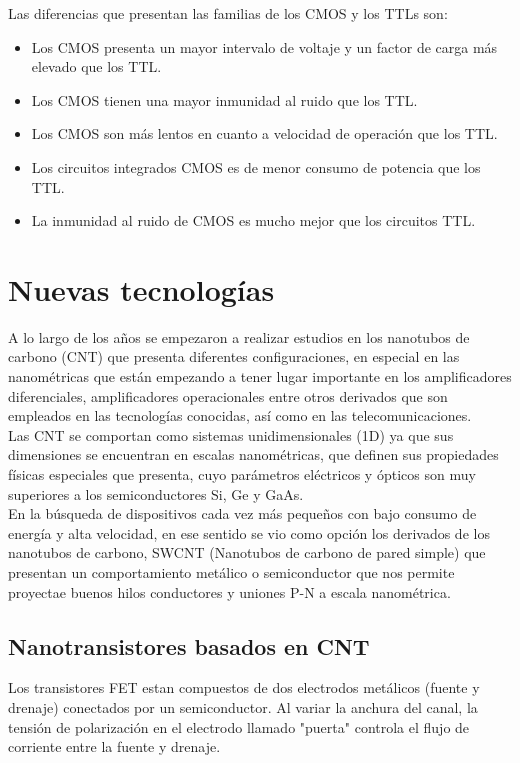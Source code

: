 \documentclass[a4paper]{article} %
\begin{document}
	Las diferencias que presentan las familias de los CMOS y los TTLs son:
	\begin{itemize}
		\item Los CMOS presenta un mayor intervalo de voltaje y un factor de carga más elevado que los TTL.
		\item Los CMOS tienen una mayor inmunidad al ruido que los TTL.
		\item Los CMOS son más lentos en cuanto a velocidad de operación que los TTL.
		\item Los circuitos integrados CMOS es de menor consumo de potencia que los TTL.
		\item La inmunidad al ruido de CMOS es mucho mejor que los circuitos TTL.
	\end{itemize}


\section{Nuevas tecnologías}

	A lo largo de los años se empezaron a realizar estudios en los nanotubos de carbono (CNT) que presenta diferentes configuraciones, en especial en las nanométricas que están empezando a tener lugar importante en los amplificadores diferenciales, amplificadores operacionales entre otros derivados que son empleados en las tecnologías conocidas, así como en las telecomunicaciones.\\
	
	Las CNT se comportan como sistemas unidimensionales (1D) ya que sus dimensiones se encuentran en escalas nanométricas, que definen sus propiedades físicas especiales que presenta, cuyo parámetros eléctricos y ópticos son muy superiores a los semiconductores Si, Ge y GaAs.\\
	
	En la búsqueda de dispositivos cada vez más pequeños con bajo consumo de energía y alta velocidad, en ese sentido se vio como opción los derivados de los nanotubos de carbono, SWCNT (Nanotubos de carbono de pared simple) que presentan un comportamiento metálico o semiconductor que nos permite proyectae buenos hilos conductores y uniones P-N a escala nanométrica.


\subsection{Nanotransistores basados en CNT}

	Los transistores FET estan compuestos de dos electrodos metálicos (fuente y drenaje) conectados por un semiconductor. Al variar la anchura del canal, la tensión de polarización en el electrodo llamado "puerta" controla el flujo de corriente entre la fuente y drenaje.\\
	
\end{document}
